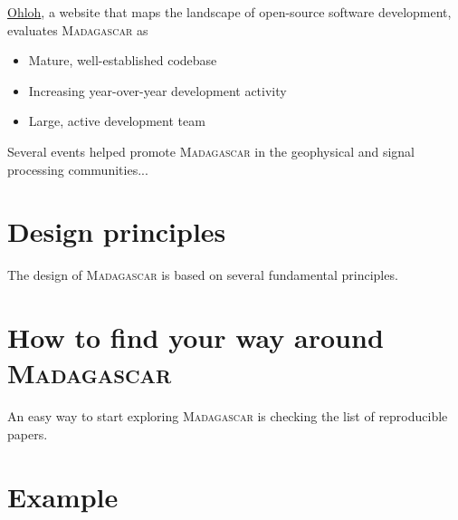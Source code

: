 \href{http://www.ohloh.net/}{Ohloh}, a website that maps the landscape
of open-source software development, evaluates \textsc{Madagascar} as
\begin{itemize}
\item Mature, well-established codebase
\item Increasing year-over-year development activity
\item Large, active development team 
\end{itemize}

Several events helped promote \textsc{Madagascar} in the geophysical
and signal processing communities...

\section{Design principles}

The design of \textsc{Madagascar} is based on several fundamental principles.

\section{How to find your way around \textsc{Madagascar}}

An easy way to start exploring \textsc{Madagascar} is checking the list of reproducible papers. 

\section{Example}



